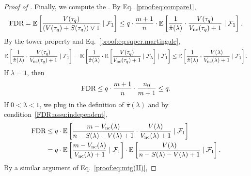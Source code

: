 \begin{proof}[Proof of ]
Finally, we compute the \FDR. By Eq.~\eqref{proof:eq:compare1},
\begin{align*}
    \text{FDR}
    = \mathbb{E}\left[\frac{{V}({\tau_q})}{({V}({\tau_q}) + {S}({\tau_q})) \vee 1} \mid \mathcal{F}_1 \right]
    \le q \cdot \frac{m+1}{{n}} \cdot \mathbb{E}\left[\frac{1}{\hat{\pi}(\lambda)} \cdot \frac{{V}({\tau_q})}{{V_{\text{nc}}}({\tau_q}) + 1} \mid \mathcal{F}_1 \right].
\end{align*}
By the tower property and Eq.~\eqref{proof:eq:super.martingale},
\begin{align*}
    \mathbb{E}\left[\frac{1}{\hat{\pi}(\lambda)} \cdot \frac{{V}({\tau_q})}{{V_{\text{nc}}}({\tau_q}) + 1} \mid \mathcal{F}_1 \right]
    = \mathbb{E}\left[\frac{1}{\hat{\pi}(\lambda)} \cdot \mathbb{E}\left[\frac{{V}({\tau_q})}{{V_{\text{nc}}}({\tau_q}) + 1} \mid \mathcal{F}_\lambda\right]\mid \mathcal{F}_1 \right]
    \le \mathbb{E}\left[\frac{1}{\hat{\pi}(\lambda)} \cdot \frac{{V}(\lambda)}{{V_{\text{nc}}}(\lambda) + 1} \mid \mathcal{F}_1 \right].
\end{align*}
If $\lambda = 1$, then
\begin{align*}
    \text{FDR} \le q \cdot \frac{m + 1}{{n}} \cdot \frac{{n_0}}{m + 1} \le q.
\end{align*}
If $0 < \lambda < 1$, we plug in the definition of $\hat{\pi}(\lambda)$ and by condition~\ref{FDR:assu:independent},
    \begin{align*}
        \text{FDR}
        &\le q \cdot \mathbb{E}\left[\frac{m - {V_{\text{nc}}}(\lambda)}{{n} - {S}(\lambda) - {V}(\lambda) + 1} \cdot \frac{{V}(\lambda)}{{V_{\text{nc}}}(\lambda) + 1} \mid \mathcal{F}_1 \right]\\
        &= q \cdot \mathbb{E}\left[\frac{m - {V_{\text{nc}}}(\lambda)}{{V_{\text{nc}}}(\lambda) + 1} \mid \mathcal{F}_1 \right] \cdot \mathbb{E}\left[\frac{{V}(\lambda)}{{n} - {S}(\lambda) - {V}(\lambda) + 1} \mid \mathcal{F}_1 \right].
    \end{align*}
    By a similar argument of Eq.~\eqref{proof:eq:mtg(II)},

\end{proof}
